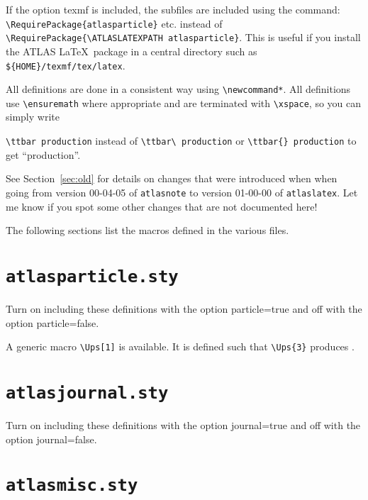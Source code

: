 \documentclass[UKenglish,texlive=2013]{\ATLASLATEXPATH atlasdoc}
\newcommand{\File}[1]{\texttt{#1}\xspace}
\newcommand{\Option}[1]{\textsf{#1}\xspace}
\newcommand{\Package}[1]{\texttt{#1}\xspace}
\begin{document}
If the  option \Option{texmf} is included, the subfiles are included using the command:
\verb|\RequirePackage{atlasparticle}| etc. instead of \verb|\RequirePackage{\ATLASLATEXPATH atlasparticle}|.
This is useful if you install the ATLAS \LaTeX\ package in a central directory such as \File{\$\{HOME\}/texmf/tex/latex}.

All definitions are done in a consistent way using \verb|\newcommand*|.
All definitions use \verb|\ensuremath| where appropriate and are terminated with
\verb|\xspace|, so you can simply write {\verb|\ttbar production| instead of
\verb|\ttbar\ production| or \verb|\ttbar{} production| to get \enquote{\ttbar production}.

See Section~\ref{sec:old} for details on changes that were introduced when
when going from version 00-04-05 of \Package{atlasnote}
to version 01-00-00 of \Package{atlaslatex}.
Let me know if you spot some other changes that are not documented here!

The following sections list the macros defined in the various files.

\twocolumn
\section{\File{atlasparticle.sty}}

Turn on including these definitions with the option \Option{particle=true} and off with the option \Option{particle=false}.



A generic macro \verb|\Ups[1]| is available.
It is defined such that \verb|\Ups{3}| produces .


\newpage
\section{\File{atlasjournal.sty}}

Turn on including these definitions with the option \Option{journal=true} and off with the option \Option{journal=false}.




\newpage
\section{\File{atlasmisc.sty}}

}
\end{document}
